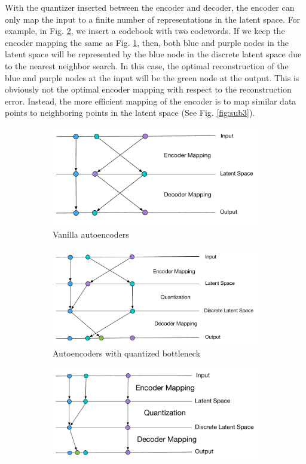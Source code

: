 \documentclass[letterpaper]{article} %
\begin{document}
With the quantizer inserted between the encoder and decoder, the encoder can only map the input to a finite number of representations in the latent space. For example, in Fig. \ref{fig: q2}, we insert a codebook with two codewords. If we keep the encoder mapping the same as Fig. \ref{fig: q1}, then, both blue and purple nodes in the latent space will be represented by the blue node in the discrete latent space due to the nearest neighbor search. In this case, the optimal reconstruction of the blue and purple nodes at the input will be the green node at the output. This is obviously not the optimal encoder mapping with respect to the reconstruction error. Instead, the more efficient mapping of the encoder is to map similar data points to neighboring points in the latent space (See Fig. \ref{fig:sub3}).
\begin{figure}[!ht]
\captionsetup[subfigure]{justification=centering}
\centering
	\begin{subfigure}{.45\textwidth}
	\centering
	\includegraphics[width=.8\linewidth]{twolayer_original.pdf}
	\caption{Vanilla autoencoders}
		\label{fig: q1}
	\end{subfigure}
\begin{subfigure}{.45\textwidth}
\centering
	\includegraphics[width=.8\linewidth]{twolayer_noise.pdf}
	\caption{Autoencoders with quantized bottleneck}
		\label{fig: q2}
\end{subfigure}
\begin{subfigure}{.45\textwidth}
\centering
\includegraphics[width=.8\linewidth]{BetterMapping.pdf}

\end{subfigure}
\end{figure}
\end{document}
